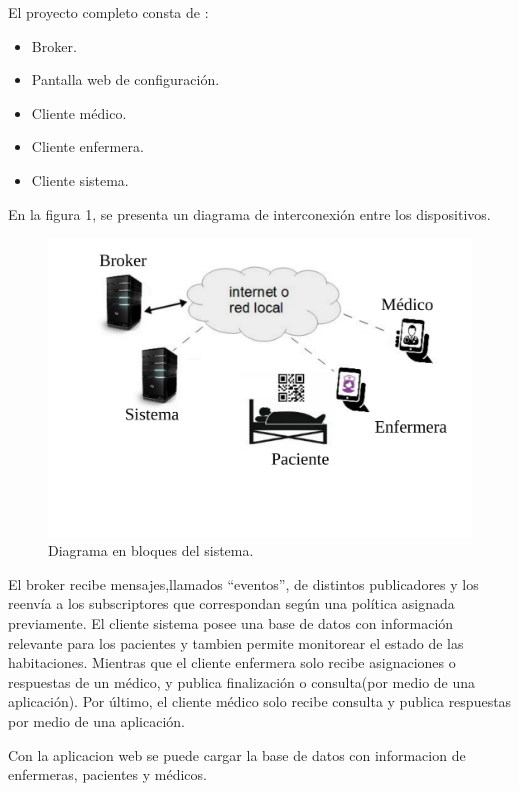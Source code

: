 \documentclass[
11pt, %
]{charter}
\begin{document}
\vspace{50px}

El proyecto completo consta de :
\begin{itemize}
\item Broker.
\item Pantalla web de configuración.
\item Cliente médico.
\item Cliente enfermera.
\item Cliente sistema.
\end{itemize}
En la figura 1, se presenta un diagrama de interconexión entre los dispositivos.



\begin{figure}[htpb]
\centering 
\includegraphics[width=.7\textwidth]{./Figuras/diag2.pdf}
\caption{ Diagrama en bloques del sistema.}
\label{fig:diagBloques}
\end{figure}


El broker recibe mensajes,llamados ``eventos'', de distintos publicadores y los reenvía a los subscriptores que correspondan según una política asignada previamente. El cliente sistema posee una base de datos con información relevante para los pacientes y tambien permite monitorear el estado de las habitaciones. Mientras que el cliente enfermera solo recibe asignaciones o respuestas de un médico, y publica finalización o consulta(por medio de una aplicación). Por último, el cliente médico solo recibe consulta y publica respuestas por medio de una aplicación.

Con la aplicacion web se puede cargar la base de datos con informacion de enfermeras, pacientes y médicos.
\vfill

 
\end{document}
